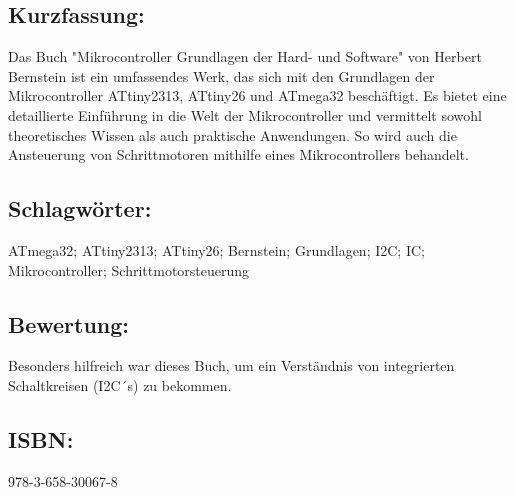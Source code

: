 \hfill
\begin{minipage}{0.48\textwidth}
\subsection*{Kurzfassung:}
Das Buch "Mikrocontroller Grundlagen der Hard- und Software" von Herbert Bernstein ist ein umfassendes Werk, das sich mit den Grundlagen der Mikrocontroller ATtiny2313, ATtiny26 und ATmega32 beschäftigt. Es bietet eine detaillierte Einführung in die Welt der Mikrocontroller und vermittelt sowohl theoretisches Wissen als auch praktische Anwendungen. So wird auch die Ansteuerung von Schrittmotoren mithilfe eines Mikrocontrollers behandelt.		
\end{minipage}
\subsection*{Schlagwörter:}
ATmega32; ATtiny2313; ATtiny26; Bernstein; Grundlagen; I2C; IC; Mikrocontroller; Schrittmotorsteuerung
\subsection*{Bewertung:}
Besonders hilfreich war dieses Buch, um ein Verständnis von integrierten Schaltkreisen (I2C´s)  zu bekommen.
\subsection*{ISBN:}
978-3-658-30067-8

